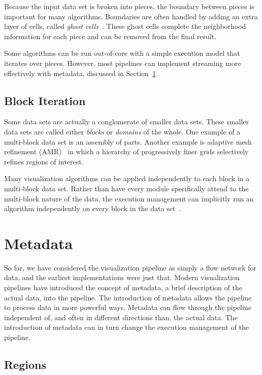 \documentclass[journal,onecolumn,12pt,letterpaper,twoside]{IEEEtran}
\newcommand*{\lcite}[1]{~\cite{#1}}
\newcommand*{\keyterm}[1]{\emph{#1}}
\begin{document}
Because the input data set is broken into pieces, the boundary between
pieces is important for many algorithms.  Boundaries are often handled by
adding an extra layer of cells, called \keyterm{ghost
  cells}\lcite{Ahrens2001}.  These ghost cells complete the neighborhood
information for each piece and can be removed from the final result.

Some algorithms can be run out-of-core with a simple execution model that
iterates over pieces.  However, most pipelines can implement streaming more
effectively with metadata, discussed in Section~\ref{sec:Metadata}.

\subsection{Block Iteration}
\label{sec:BlockIteration}

Some data sets are actually a conglomerate of smaller data sets.  These
smaller data sets are called either \keyterm{blocks} or \keyterm{domains}
of the whole.  One example of a multi-block data set is an assembly of
parts.  Another example is adaptive mesh refinement (AMR)\lcite{Berger1989}
in which a hierarchy of progressively finer grids selectively refines
regions of interest.

Many visualization algorithms can be applied independently to each block in
a multi-block data set.  Rather than have every module specifically
attend to the multi-block nature of the data, the execution management can
implicitly run an algorithm independently on every block in the data
set\lcite{VTKUsersGuide}.


\section{Metadata}
\label{sec:Metadata}

So far, we have considered the visualization pipeline as simply a flow
network for data, and the earliest implementations were just that.  Modern
visualization pipelines have introduced the concept of metadata, a brief
description of the actual data, into the pipeline.  The introduction of
metadata allows the pipeline to process data in more powerful ways.
Metadata can flow through the pipeline independent of, and often in
different directions than, the actual data.  The introduction of metadata
can in turn change the execution management of the pipeline.

\subsection{Regions}
\label{sec:Regions}
\end{document}
